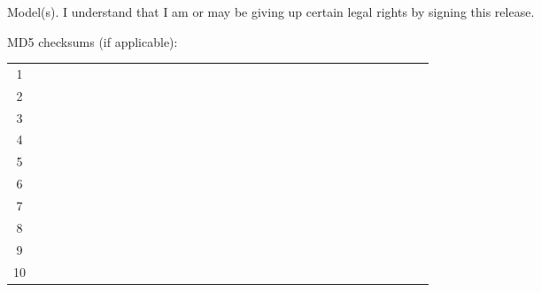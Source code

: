 \documentclass[a4paper,romanian,english]{article}
\begin{document}
Model(s).
I understand that I am or may be giving up certain legal rights by signing this release.\\
\begin{center}
    MD5 checksums (if applicable):\vspace{0.1cm}
    \begin{tabular}{| c | c | c | c | c || c | c | c | c || c | c | c | c || c | c | c | c || c | c | c | c || c | c | c | c || c | c | c | c || c | c | c | c |}
	\hline
	\multirow{2}{*}{1}& & & & & & & & & & & & & & & & & & & & & & & & & & & & & & & & \\
	\cline{2-33}
	& & & & & & & & & & & & & & & & & & & & & & & & & & & & & & & & \\
	\hline \hline
	\multirow{2}{*}{2}& & & & & & & & & & & & & & & & & & & & & & & & & & & & & & & & \\
	\cline{2-33}
	& & & & & & & & & & & & & & & & & & & & & & & & & & & & & & & & \\
	\hline \hline
	\multirow{2}{*}{3}& & & & & & & & & & & & & & & & & & & & & & & & & & & & & & & & \\
	\cline{2-33}
	& & & & & & & & & & & & & & & & & & & & & & & & & & & & & & & & \\
	\hline \hline
	\multirow{2}{*}{4}& & & & & & & & & & & & & & & & & & & & & & & & & & & & & & & & \\
	\cline{2-33}
	& & & & & & & & & & & & & & & & & & & & & & & & & & & & & & & & \\
	\hline \hline
	\multirow{2}{*}{5}& & & & & & & & & & & & & & & & & & & & & & & & & & & & & & & & \\
	\cline{2-33}
	& & & & & & & & & & & & & & & & & & & & & & & & & & & & & & & & \\
	\hline \hline
	\multirow{2}{*}{6}& & & & & & & & & & & & & & & & & & & & & & & & & & & & & & & & \\
	\cline{2-33}
	& & & & & & & & & & & & & & & & & & & & & & & & & & & & & & & & \\
	\hline \hline
	\multirow{2}{*}{7}& & & & & & & & & & & & & & & & & & & & & & & & & & & & & & & & \\
	\cline{2-33}
	& & & & & & & & & & & & & & & & & & & & & & & & & & & & & & & & \\
	\hline \hline
	\multirow{2}{*}{8}& & & & & & & & & & & & & & & & & & & & & & & & & & & & & & & & \\
	\cline{2-33}
	& & & & & & & & & & & & & & & & & & & & & & & & & & & & & & & & \\
	\hline \hline
	\multirow{2}{*}{9}& & & & & & & & & & & & & & & & & & & & & & & & & & & & & & & & \\
	\cline{2-33}
	& & & & & & & & & & & & & & & & & & & & & & & & & & & & & & & & \\
	\hline \hline
	\multirow{2}{*}{10}& & & & & & & & & & & & & & & & & & & & & & & & & & & & & & & & \\
	\cline{2-33}
	& & & & & & & & & & & & & & & & & & & & & & & & & & & & & & & & \\
	\hline
    \end{tabular}
\end{center}
\end{document}
